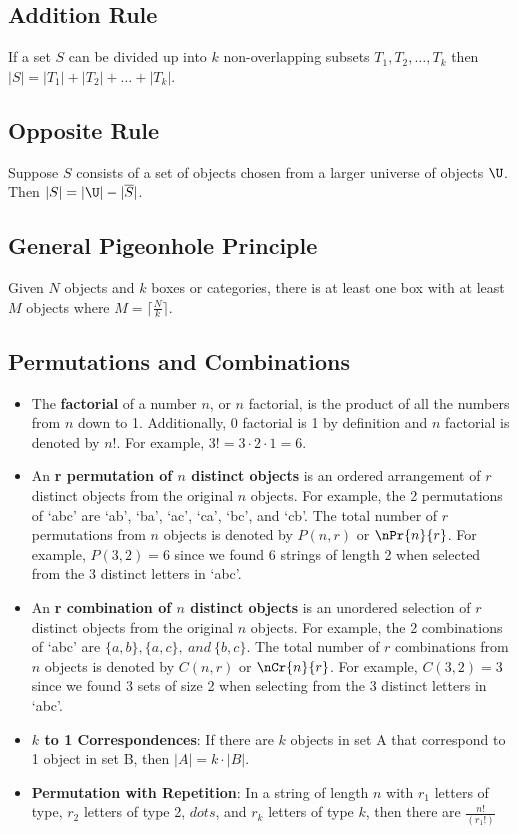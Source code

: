 \documentclass[letterpaper, 12pt]{math}
\begin{document}
\subsection*{Addition Rule}
If a set \( S \) can be divided up into \( k \) non-overlapping subsets
\( T_{1},T_{2},\dots,T_{k} \) then \( |S| = |T_{1}|+|T_{2}|+\dots+|T_{k}| \).

\subsection*{Opposite Rule}
Suppose \( S \) consists of a set of objects chosen from a larger universe of
objects \( \U \). Then \( |S| = |\U|-|\overline{S}| \).

\subsection*{General Pigeonhole Principle}
Given \( N \) objects and \( k \) boxes or categories, there is at least one box
with at least \( M \) objects where \( M = \lceil\frac{N}{k}\rceil \).

\subsection*{Permutations and Combinations}
\begin{itemize}
  \item The \textbf{factorial} of a number \( n \), or \( n \) factorial, is
    the product of all the numbers from \( n \) down to 1. Additionally, 0
    factorial is 1 by definition and \( n \) factorial is denoted by \( n! \).
    For example, \( 3! = 3\cdot2\cdot1 = 6 \).
  \item An \textbf{r permutation of \( n \) distinct objects} is an ordered
    arrangement of \( r \) distinct objects from the original \( n \) objects.
    For example, the 2 permutations of `abc' are `ab', `ba', `ac', `ca', `bc',
    and `cb'. The total number of \( r \) permutations from \( n \) objects
    is denoted by \( P(n,r) \) or \( \nPr{n}{r} \). For example, \( P(3,2) = 6
    \) since we found 6 strings of length 2 when selected from the 3 distinct
    letters in `abc'.
  \item An \textbf{r combination of \( n \) distinct objects} is an unordered
    selection of \( r \) distinct objects from the original \( n \) objects.
    For example, the 2 combinations of `abc' are \( \{a,b\},\{a,c\},\ and\
    \{b,c\} \). The total number of \( r \) combinations from \( n \) objects
    is denoted by \( C(n,r) \) or \( \nCr{n}{r} \). For example, \( C(3,2) = 3
    \) since we found 3 sets of size 2 when selecting from the 3 distinct
    letters in `abc'.
  \item \textbf{\( k \) to 1 Correspondences}: If there are \( k \) objects in
    set A that correspond to 1 object in set B, then \( |A| = k\cdot|B| \).
  \item \textbf{Permutation with Repetition}: In a string of length \( n \)
    with \( r_{1} \) letters of type, \( r_{2} \) letters of type 2,
    \( dots \), and \( r_{k} \) letters of type \( k \), then there are
    \( \frac{n!}{(r_{1}!)} \)
\end{itemize}
\end{document}
